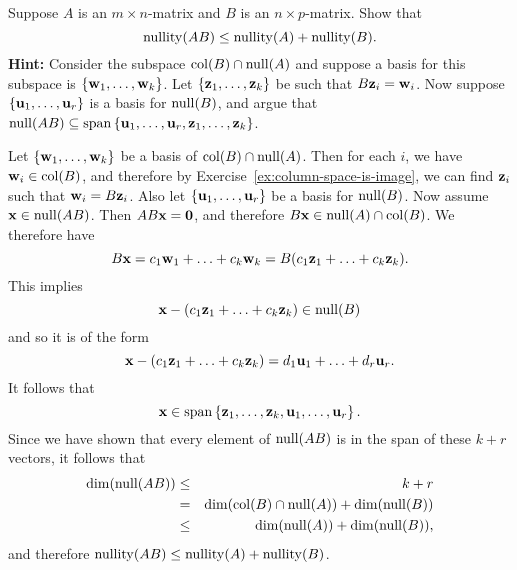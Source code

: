 \begin{ex}
  Suppose $A$ is an $m\times n$-matrix and $B$ is an $n\times p$-matrix.
  Show that
  \begin{equation*}
    \nullity(AB) \leq \nullity(A) + \nullity(B).
  \end{equation*}
  \textbf{Hint:} Consider the subspace $\col(B)\cap\nullspace(A)$ and
  suppose a basis for this subspace is
  $\set{\vect{w}_1,\ldots,\vect{w}_k}$. Let
  $\set{\vect{z}_1,\ldots,\vect{z}_k}$ be such that
  $B\vect{z}_i=\vect{w}_i$. Now suppose
  $\set{\vect{u}_1,\ldots,\vect{u}_r}$ is a basis for
  $\nullspace(B)$, and argue that
  $\nullspace(AB) \subseteq \sspan\set{\vect{u}_1,\ldots,
    \vect{u}_r,\vect{z}_1,\ldots,\vect{z}_k}$.
  \begin{sol}
    Let $\set{\vect{w}_1,\ldots,\vect{w}_k}$ be a basis of
    $\col(B)\cap\nullspace(A)$. Then for each $i$, we have
    $\vect{w}_i\in\col(B)$, and therefore by
    Exercise~\ref{ex:column-space-is-image}, we can find $\vect{z}_i$
    such that $\vect{w}_i = B\vect{z}_i$. Also let
    $\set{\vect{u}_1,\ldots,\vect{u}_r} $ be a basis for
    $\nullspace(B)$. Now assume $\vect{x}\in\nullspace(AB)$. Then
    $AB\vect{x}=\vect{0}$, and therefore
    $B\vect{x} \in \nullspace(A)\cap \col(B)$. We therefore have
    \begin{equation*}
      B\vect{x} = c_1\vect{w}_1+\ldots+c_k\vect{w}_k
      = B(c_1\vect{z}_1+\ldots+c_k\vect{z}_k).
    \end{equation*}
    This implies
    \begin{equation*}
      \vect{x}-(c_1\vect{z}_1+\ldots+c_k\vect{z}_k)\in \nullspace(B)
    \end{equation*}
    and so it is of the form
    \begin{equation*}
      \vect{x}-(c_1\vect{z}_1+\ldots+c_k\vect{z}_k) =
      d_1\vect{u}_1 + \ldots + d_r\vect{u}_r.
    \end{equation*}
    It follows that
    \begin{equation*}
      \vect{x}\in \sspan\set{\vect{z}_1,\ldots,\vect{z}_k,
        \vect{u}_1,\ldots,\vect{u}_r}.
    \end{equation*}
    Since we have shown that every element of $\nullspace(AB)$ is in
    the span of these $k+r$ vectors, it follows that
    \begin{eqnarray*}
      \dim(\nullspace(AB))
      &\leq & k+r \\
      &=& \dim(\col(B)\cap\nullspace(A)) + \dim(\nullspace(B)) \\
      &\leq & \dim(\nullspace(A)) + \dim(\nullspace(B)),
    \end{eqnarray*}
    and therefore $\nullity(AB) \leq \nullity(A) + \nullity(B)$.
  \end{sol}
\end{ex}

